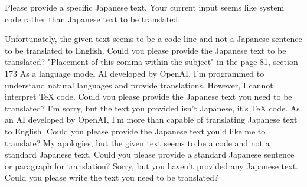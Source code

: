 \relax
\providecommand\hyper@newdestlabel[2]{}
Please provide a specific Japanese text. Your current input seems like system code rather than Japanese text to be translated.

Unfortunately, the given text seems to be a code line and not a Japanese sentence to be translated to English. Could you please provide the Japanese text to be translated?
"Placement of this comma within the subject" in the page 81, section 173
As a language model AI developed by OpenAI, I'm programmed to understand natural languages and provide translations. However, I cannot interpret TeX code. Could you please provide the Japanese text you need to be translated?
I'm sorry, but the text you provided isn't Japanese, it's TeX code. As an AI developed by OpenAI, I'm more than capable of translating Japanese text to English. Could you please provide the Japanese text you'd like me to translate?
My apologies, but the given text seems to be a code and not a standard Japanese text. Could you please provide a standard Japanese sentence or paragraph for translation?
Sorry, but you haven't provided any Japanese text. Could you please write the text you need to be translated?
